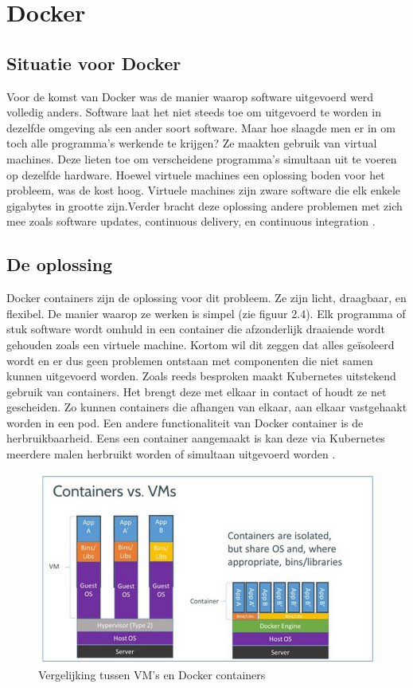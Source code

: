 \section{Docker}
\label{sec:docker}

\subsection{Situatie voor Docker}
Voor de komst van Docker was de manier waarop software uitgevoerd werd volledig anders. Software laat het niet steeds toe om uitgevoerd te worden in dezelfde omgeving als een ander soort software. Maar hoe slaagde men er in om toch alle programma's werkende te krijgen? Ze maakten gebruik van virtual machines. Deze lieten toe om verscheidene programma's simultaan uit te voeren op dezelfde hardware. Hoewel virtuele machines een oplossing boden voor het probleem, was de kost hoog. Virtuele machines zijn zware software die elk enkele gigabytes in grootte zijn.Verder bracht deze oplossing andere problemen met zich mee  zoals software updates, continuous delivery, en continuous integration \autocite{yegulalp2018}.

\subsection{De oplossing}
Docker containers zijn de oplossing voor dit probleem. Ze zijn licht, draagbaar, en flexibel. De manier waarop ze werken is simpel (zie figuur 2.4). Elk programma of stuk software wordt omhuld in een container die afzonderlijk draaiende wordt gehouden zoals een virtuele machine. Kortom wil dit zeggen dat alles geïsoleerd wordt en er dus geen problemen ontstaan met componenten die niet samen kunnen uitgevoerd worden. Zoals reeds besproken maakt Kubernetes uitstekend gebruik van containers. Het brengt deze met elkaar in contact of houdt ze net gescheiden. Zo kunnen containers die afhangen van elkaar, aan elkaar vastgehaakt worden in een pod. Een andere functionaliteit van Docker container is de herbruikbaarheid. Eens een container aangemaakt is kan deze via Kubernetes meerdere malen herbruikt worden of simultaan uitgevoerd worden \autocite{yegulalp2018}.

\begin{figure}[ht]
    \centering
    \includegraphics[scale=0.6]{img/docker-vm-vergelijking}
    \caption[Vergelijking tussen VM's en Docker containers]{Vergelijking tussen VM's en Docker containers \cite{vaughan2018}}
\end{figure}

